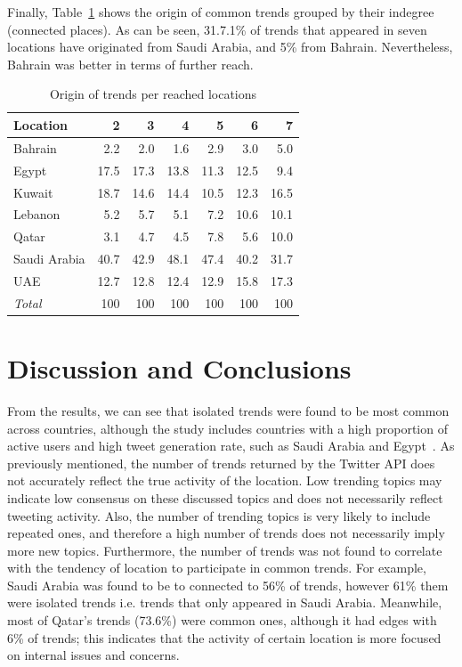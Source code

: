 \documentclass{llncs}
\begin{document}
Finally, Table~\ref{tbl:trendorigin} shows the origin of common trends
grouped by their indegree (connected places). As can be seen, 31.7.1\%
of trends that appeared in seven locations have originated from Saudi
Arabia, and 5\% from Bahrain. Nevertheless, Bahrain was better in
terms of further reach.

\begin{table}[!h]
\centering
\caption{Origin of trends per reached locations}
\begin{tabular}{@{}lrrrrrr@{}}
\toprule
Location & 2 & 3 & 4 & 5 & 6 & 7 \\ 
\midrule
Bahrain &           2.2 &   2.0 &   1.6 &   2.9 &   3.0 &    5.0 \\
Egypt &            17.5 & 17.3 & 13.8 & 11.3 & 12.5 &    9.4\\
Kuwait &          18.7 & 14.6  & 14.4 & 10.5 & 12.3 & 16.5\\
Lebanon &         5.2 &   5.7 &    5.1 &   7.2 & 10.6 & 10.1 \\
Qatar &              3.1 &   4.7 &    4.5 &   7.8 &   5.6 & 10.0 \\
Saudi Arabia & 40.7 & 42.9 &  48.1 & 47.4 & 40.2 & 31.7 \\
UAE &              12.7 & 12.8 &  12.4 & 12.9 & 15.8 & 17.3 \\
\midrule
{\emph{Total}} & 100 & 100 & 100 & 100 & 100 &  100 \\
\bottomrule
\end{tabular}
\label{tbl:trendorigin}
\end{table}


\section{Discussion and Conclusions}\label{dissconc}

From the results, we can see that isolated trends were found to be
most common across countries, although the study includes countries
with a high proportion of active users and high tweet generation rate,
such as Saudi Arabia and Egypt~\cite{Salem2017}. As previously
mentioned, the number of trends returned by the Twitter API does not
accurately reflect the true activity of the location. Low trending
topics may indicate low consensus on these discussed topics and does
not necessarily reflect tweeting activity. Also, the number of
trending topics is very likely to include repeated ones, and therefore
a high number of trends does not necessarily imply more new
topics. Furthermore, the number of trends was not found to correlate
with the tendency of location to participate in common trends. For
example, Saudi Arabia was found to be to connected to 56\% of trends,
however 61\% them were isolated trends i.e. trends that only appeared
in Saudi Arabia. Meanwhile, most of Qatar's trends (73.6\%) were
common ones, although it had edges with 6\% of trends; this indicates
that the activity of certain location is more focused on internal
issues and concerns.
\end{document}

